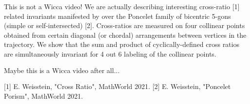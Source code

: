 This is not a Wicca video! We are actually describing interesting cross-ratio [1] related invariants manifested by over the Poncelet family of bicentric 5-gons (simple or self-intersected) [2]. Cross-ratios are measured on four collinear points obtained from certain diagonal (or chordal) arrangements between vertices in the trajectory. We show that the sum and product of cyclically-defined cross ratios are simultaneously invariant for 4 out 6 labeling of the collinear points.

Maybe this is a Wicca video after all...

[1] E. Weisstein, "Cross Ratio", MathWorld 2021.
[2] E. Weisstein, "Poncelet Porism", MathWorld 2021.